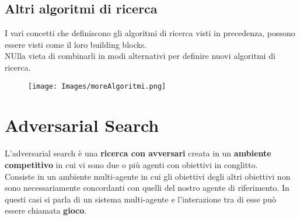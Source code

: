 \documentclass{article}
\begin{document}
\subsection{Altri algoritmi di ricerca}
I vari concetti che definiscono gli algoritmi di ricerca visti in precedenza, possono essere visti come il loro building blocks.
\\ NUlla vieta di combinarli in modi alternativi per definire nuovi algoritmi di ricerca.
\begin{figure}[H]
    \centering
    \texttt{[image: Images/moreAlgoritmi.png]}
\end{figure}
\section{Adversarial Search}
L'adversarial search è una \textbf{ricerca con avversari} creata in un \textbf{ambiente competitivo} in cui vi sono due o più agenti con obiettivi in conglitto.
\\ Consiste in un ambiente multi-agente in cui gli obiettivi degli altri obiettivi non sono necessariamente concordanti con quelli del nostro agente di riferimento. In questi casi si parla di un sistema
multi-agente e l'interazione tra di esse può essere chiamata \textbf{gioco}.
\end{document}
